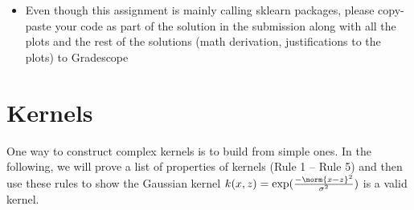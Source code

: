 \documentclass[11pt]{article}
\begin{document}
\begin{itemize}
\item Even though this assignment is mainly calling sklearn packages, please copy-paste your code as part of the solution in the submission along with all the plots and the rest of the solutions (math derivation, justifications to the plots) to Gradescope

\end{itemize}
\clearpage
\fi

\section{Kernels }
One way to construct complex kernels is to build from simple ones. 
In the following, we will prove a list of properties of kernels (Rule 1 -- Rule 5) and then use these rules to show the Gaussian kernel $k(x,z) = \exp (\frac{-\norm{x-z}^2}{\sigma^2})$ is a valid kernel.
\end{document}
